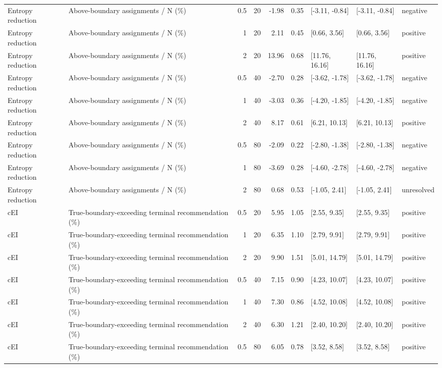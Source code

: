 \begin{longtable}{p{1.8cm}p{3.0cm}rrrrp{2.6cm}p{2.6cm}p{1.6cm}}
Entropy reduction & Above-boundary assignments / N (\%) & 0.5 & 20 & -1.98 & 0.35 & [-3.11, -0.84] & [-3.11, -0.84] & negative \\
Entropy reduction & Above-boundary assignments / N (\%) & 1 & 20 & 2.11 & 0.45 & [0.66, 3.56] & [0.66, 3.56] & positive \\
Entropy reduction & Above-boundary assignments / N (\%) & 2 & 20 & 13.96 & 0.68 & [11.76, 16.16] & [11.76, 16.16] & positive \\
Entropy reduction & Above-boundary assignments / N (\%) & 0.5 & 40 & -2.70 & 0.28 & [-3.62, -1.78] & [-3.62, -1.78] & negative \\
Entropy reduction & Above-boundary assignments / N (\%) & 1 & 40 & -3.03 & 0.36 & [-4.20, -1.85] & [-4.20, -1.85] & negative \\
Entropy reduction & Above-boundary assignments / N (\%) & 2 & 40 & 8.17 & 0.61 & [6.21, 10.13] & [6.21, 10.13] & positive \\
Entropy reduction & Above-boundary assignments / N (\%) & 0.5 & 80 & -2.09 & 0.22 & [-2.80, -1.38] & [-2.80, -1.38] & negative \\
Entropy reduction & Above-boundary assignments / N (\%) & 1 & 80 & -3.69 & 0.28 & [-4.60, -2.78] & [-4.60, -2.78] & negative \\
Entropy reduction & Above-boundary assignments / N (\%) & 2 & 80 & 0.68 & 0.53 & [-1.05, 2.41] & [-1.05, 2.41] & unresolved \\
cEI & True-boundary-exceeding terminal recommendation (\%) & 0.5 & 20 & 5.95 & 1.05 & [2.55, 9.35] & [2.55, 9.35] & positive \\
cEI & True-boundary-exceeding terminal recommendation (\%) & 1 & 20 & 6.35 & 1.10 & [2.79, 9.91] & [2.79, 9.91] & positive \\
cEI & True-boundary-exceeding terminal recommendation (\%) & 2 & 20 & 9.90 & 1.51 & [5.01, 14.79] & [5.01, 14.79] & positive \\
cEI & True-boundary-exceeding terminal recommendation (\%) & 0.5 & 40 & 7.15 & 0.90 & [4.23, 10.07] & [4.23, 10.07] & positive \\
cEI & True-boundary-exceeding terminal recommendation (\%) & 1 & 40 & 7.30 & 0.86 & [4.52, 10.08] & [4.52, 10.08] & positive \\
cEI & True-boundary-exceeding terminal recommendation (\%) & 2 & 40 & 6.30 & 1.21 & [2.40, 10.20] & [2.40, 10.20] & positive \\
cEI & True-boundary-exceeding terminal recommendation (\%) & 0.5 & 80 & 6.05 & 0.78 & [3.52, 8.58] & [3.52, 8.58] & positive \\

\end{longtable}
